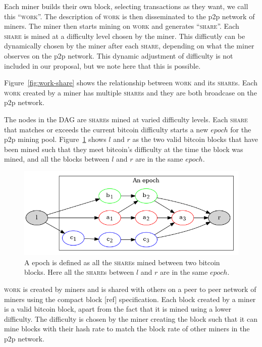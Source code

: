 \documentclass{article}
\begin{document}
Each miner builds their own block, selecting transactions as they
want, we call this ``\textsc{work}''. The description of \textsc{work}
is then disseminated to the p2p network of miners. The miner then
starts mining on \textsc{work} and generates ``\textsc{share}''. Each
\textsc{share} is mined at a difficulty level chosen by the
miner. This difficutly can be dynamically chosen by the miner after
each \textsc{share}, depending on what the miner observes on the p2p
network. This dynamic adjustment of difficulty is not included in our
proposal, but we note here that this is possible.

Figure~\ref{fig:work-share} shows the relationship between
\textsc{work} and its \textsc{share}s. Each \textsc{work} created by a
miner has multiple \textsc{share}s and they are both broadcase on the
p2p network.

The nodes in the DAG are \textsc{share}s mined at varied difficulty
levels. Each \textsc{share} that matches or exceeds the current
bitcoin difficulty starts a new $epoch$ for the p2p mining
pool. Figure~\ref{fig:epoch} shows $l$ and $r$ as the two valid
bitcoin blocks that have been mined such that they meet bitcoin's
difficulty at the time the block was mined, and all the blocks between
$l$ and $r$ are in the same $epoch$.

\begin{figure}[h]
  \includegraphics[width=1.0\textwidth]{epoch}
  \caption{A epoch is defined as all the \textsc{share}s mined between two
    bitcoin blocks. Here all the \textsc{share}s between $l$ and $r$ are in
    the same $epoch$.}\label{fig:epoch}
\end{figure}

\textsc{work} is created by miners and is shared with others on a peer
to peer network of miners using the compact block [ref]
specification. Each block created by a miner is a valid bitcoin block,
apart from the fact that it is mined using a lower difficulty. The
difficulty is chosen by the miner creating the block such that it can
mine blocks with their hash rate to match the block rate of other
miners in the p2p network.
\end{document}

